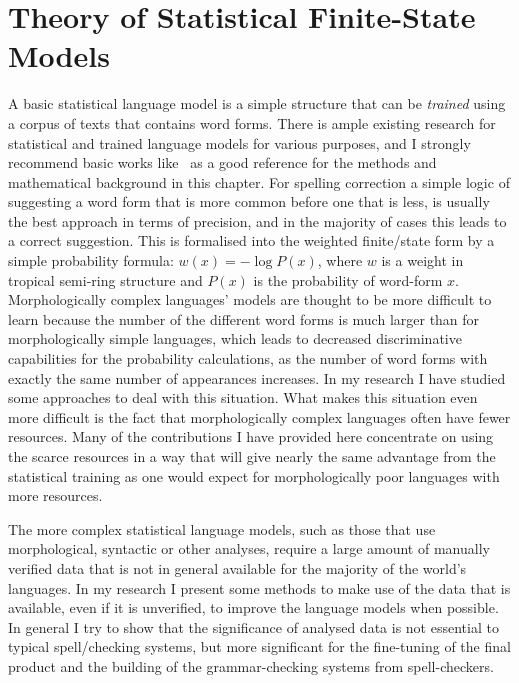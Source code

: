 \documentclass[officiallayout,final]{unihelcompling}
\begin{document}
\section{Theory of Statistical Finite-State Models}
\label{sec:statistical}

A basic statistical language model is a simple structure that can be
\emph{trained} using a corpus of texts that contains word forms. There is ample
existing research for statistical and trained language models for various
purposes, and I strongly recommend basic works
like~\citet{manning1999foundations} as a good reference for the methods and
mathematical background in this chapter.  For spelling correction a simple
logic of suggesting a word form that is more common before one that is less, is
usually the best approach in terms of precision, and in the majority of cases
this leads to a correct suggestion. This is formalised into the weighted
finite\-/state form by a simple probability formula: $w(x) = -\log P(x)$, where
$w$ is a weight in tropical semi-ring structure and $P(x)$ is the probability
of word-form $x$.  Morphologically complex languages' models are thought to be
more difficult to learn because the number of the different word forms is much
larger than for morphologically simple languages, which leads to decreased
discriminative capabilities for the probability calculations, as the number of
word forms with exactly the same number of appearances increases. In my
research I have studied some approaches to deal with this situation.  What
makes this situation even more difficult is the fact that morphologically
complex languages often have fewer resources.  Many of the contributions I have
provided here concentrate on using the scarce resources in a way that will give
nearly the same advantage from the statistical training as one would expect for
morphologically poor languages with more resources.

The more complex statistical language models, such as those that use
morphological, syntactic or other analyses, require a large amount of manually
verified data that is not in general available for the majority of the world's
languages. In my research I present some methods to make use of the data that
is available, even if it is unverified, to improve the language models when
possible. In general I try to show that the significance of analysed data is
not essential to typical spell\-/checking systems, but more significant for the
fine-tuning of the final product and the building of the grammar-checking
systems from spell-checkers.
\end{document}

